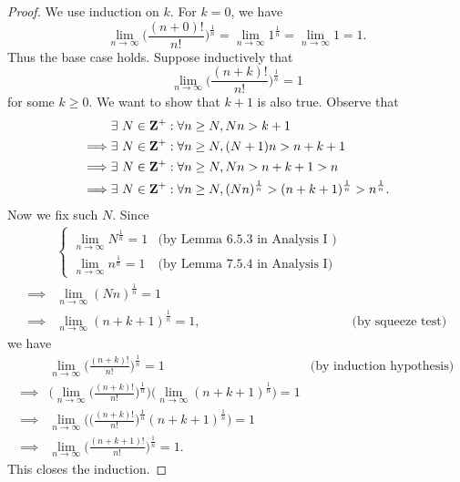 \begin{proof}
  We use induction on \(k\).
  For \(k = 0\), we have
  \[
    \lim_{n \to \infty} \bigg(\frac{(n + 0)!}{n!}\bigg)^{\frac{1}{n}} = \lim_{n \to \infty} 1^{\frac{1}{n}} = \lim_{n \to \infty} 1 = 1.
  \]
  Thus the base case holds.
  Suppose inductively that
  \[
    \lim_{n \to \infty} \bigg(\frac{(n + k)!}{n!}\bigg)^{\frac{1}{n}} = 1
  \]
  for some \(k \geq 0\).
  We want to show that \(k + 1\) is also true.
  Observe that
  \begin{align*}
             & \exists\ N \in \mathbf{Z}^+ : \forall n \geq N, Nn > k + 1                                                        \\
    \implies & \exists\ N \in \mathbf{Z}^+ : \forall n \geq N, (N + 1)n > n + k + 1                                              \\
    \implies & \exists\ N \in \mathbf{Z}^+ : \forall n \geq N, Nn > n + k + 1 > n                                                \\
    \implies & \exists\ N \in \mathbf{Z}^+ : \forall n \geq N, (Nn)^{\frac{1}{n}} > (n + k + 1)^{\frac{1}{n}} > n^{\frac{1}{n}}.
  \end{align*}
  Now we fix such \(N\).
  Since
  \begin{align*}
             & \begin{cases}
                 \lim_{n \to \infty} N^{\frac{1}{n}} = 1 & \text{(by Lemma 6.5.3 in Analysis I )} \\
                 \lim_{n \to \infty} n^{\frac{1}{n}} = 1 & \text{(by Lemma 7.5.4 in Analysis I)}
               \end{cases}                               \\
    \implies & \lim_{n \to \infty} (Nn)^{\frac{1}{n}} = 1                                                                                \\
    \implies & \lim_{n \to \infty} (n + k + 1)^{\frac{1}{n}} = 1,                                             & \text{(by squeeze test)}
  \end{align*}
  we have
  \begin{align*}
             & \lim_{n \to \infty} \bigg(\frac{(n + k)!}{n!}\bigg)^{\frac{1}{n}} = 1                                                                       & \text{(by induction hypothesis)} \\
    \implies & \Bigg(\lim_{n \to \infty} \bigg(\frac{(n + k)!}{n!}\bigg)^{\frac{1}{n}}\Bigg) \bigg(\lim_{n \to \infty} (n + k + 1)^{\frac{1}{n}}\bigg) = 1                                    \\
    \implies & \lim_{n \to \infty} \Bigg(\bigg(\frac{(n + k)!}{n!}\bigg)^{\frac{1}{n}} (n + k + 1)^{\frac{1}{n}}\Bigg) = 1                                                                    \\
    \implies & \lim_{n \to \infty} \bigg(\frac{(n + k + 1)!}{n!}\bigg)^{\frac{1}{n}} = 1.
  \end{align*}
  This closes the induction.
\end{proof}

